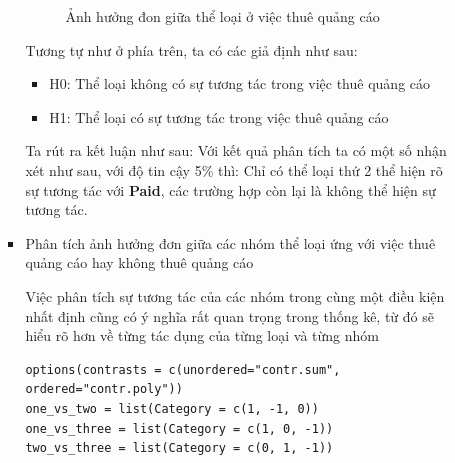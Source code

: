 \begin{itemize}
\begin{itemize}
\begin{itemize}
\begin{figure}[H]
                \caption{Ảnh hưởng đon giữa thể loại ở việc thuê quảng cáo}
                \label{fig:Ảnh hưởng đon giữa thể loại ở việc thuê quảng cáo}
            \end{figure}
            Tương tự như ở phía trên, ta có các giả định như sau:
            \begin{itemize}
                \item H0: Thể loại không có sự tương tác trong việc thuê quảng cáo
                \item H1: Thể loại có sự tương tác trong việc thuê quảng cáo
            \end{itemize}
        Ta rút ra kết luận như sau: Với kết quả phân tích ta có một số nhận xét như sau, với độ tin cậy 5\% thì: Chỉ có thể loại thứ 2 thể hiện rõ sự tương tác với \textbf{Paid}, các trường hợp còn lại là không thể hiện sự tương tác.

        \item Phân tích ảnh hưởng đơn giữa các nhóm thể loại ứng với việc thuê quảng cáo hay không thuê quảng cáo
        
        Việc phân tích sự tương tác của các nhóm trong cùng một điều kiện nhất định cũng có ý nghĩa rất quan trọng trong thống kê, từ đó sẽ hiểu rõ hơn về từng tác dụng của từng loại và từng nhóm
        \begin{lstlisting}
options(contrasts = c(unordered="contr.sum", ordered="contr.poly"))
one_vs_two = list(Category = c(1, -1, 0))
one_vs_three = list(Category = c(1, 0, -1))
two_vs_three = list(Category = c(0, 1, -1))
        \end{lstlisting}


\end{itemize}
\end{itemize}
\end{itemize}
